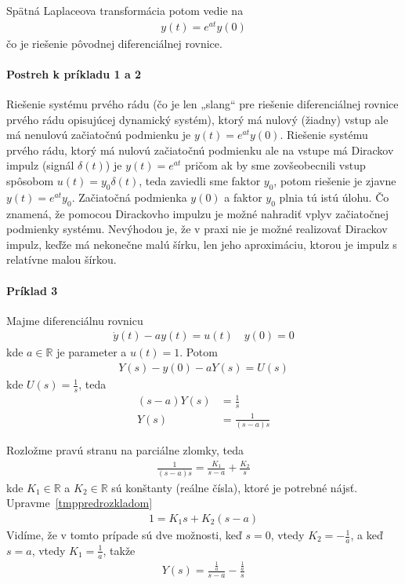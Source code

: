 \documentclass[a4paper, 10pt, ]{article}
\begin{document}
Spätná Laplaceova transformácia potom vedie na
\begin{align}
    y(t) = e^{at} y(0)
\end{align}
čo je riešenie pôvodnej diferenciálnej rovnice.


\paragraph{Postreh k príkladu 1 a 2}
Riešenie systému prvého rádu (čo je len „slang“ pre riešenie diferenciálnej rovnice prvého rádu opisujúcej dynamický systém), ktorý má nulový (žiadny) vstup ale má nenulovú začiatočnú podmienku je $y(t) = e^{at} y(0)$. Riešenie systému prvého rádu, ktorý má nulovú začiatočnú podmienku ale na vstupe má Dirackov impulz (signál $\delta(t)$) je $y(t) = e^{at}$ pričom ak by sme zovšeobecnili vstup spôsobom $u(t) = y_0 \delta(t)$, teda zaviedli sme faktor $y_0$, potom riešenie je zjavne $y(t) = e^{at} y_0 $. Začiatočná podmienka $y(0)$ a faktor $y_0$ plnia tú istú úlohu. Čo znamená, že pomocou Dirackovho impulzu je možné nahradiť vplyv začiatočnej podmienky systému. Nevýhodou je, že v praxi nie je možné realizovať Dirackov impulz, keďže má nekonečne malú šírku, len jeho aproximáciu, ktorou je impulz s relatívne malou šírkou.





\paragraph{Príklad 3}

Majme diferenciálnu rovnicu
\begin{align}
    \dot y(t) - a y(t) = u(t) \quad y(0) = 0
\end{align}
kde $a \in \mathbb R$ je parameter a $u(t) = 1$. Potom
\begin{align}
    Y(s) - y(0) - aY(s) = U(s)
\end{align}
kde $U(s) = \frac{1}{s}$, teda
\begin{align}
    (s - a)Y(s) &= \frac{1}{s} \\
    Y(s) &= \frac{1}{(s-a)s}
\end{align}

Rozložme pravú stranu na parciálne zlomky, teda
\begin{align} \label{tmppredrozkladom}
    \frac{1}{(s-a)s} = \frac{K_1}{s-a} + \frac{K_2}{s}
\end{align}
kde $K_1 \in \mathbb R$ a $K_2 \in \mathbb R$ sú konštanty (reálne čísla), ktoré je potrebné nájsť. Upravme~\eqref{tmppredrozkladom}
\begin{align}
    1 = K_1 s + K_2 (s - a)
\end{align}
Vidíme, že v tomto prípade sú dve možnosti, keď $s = 0$, vtedy $K_2 = - \frac{1}{a}$, a keď $s = a$, vtedy $K_1 = \frac{1}{a}$, takže
\begin{align}
    Y(s) = \frac{\frac{1}{a}}{s-a} - \frac{\frac{1}{a}}{s}
\end{align}
\end{document}
